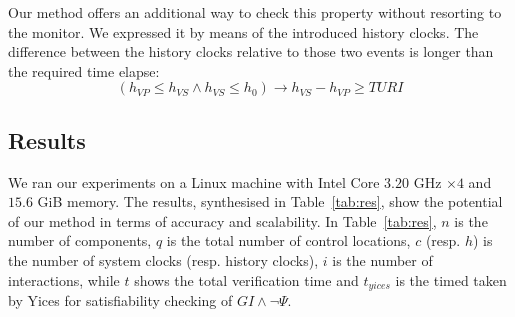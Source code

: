 \documentclass{LMCS}
\newcommand{\mycomment}[1]{}
\newcommand{\q}[1]{\textcolor{Fuchsia}{Q: #1}}
\theoremstyle{plain}\newtheorem{remark}[thm]{Remark}
\theoremstyle{plain}\newtheorem{example}[thm]{Example}
\begin{document}
Our method offers an additional way to check this property without
resorting to the monitor. We expressed it by means of the introduced
history clocks. The difference between the history clocks relative to
those two events is longer than the required time elapse:
\[(h_{VP} \leq h_{VS}  \wedge h_{VS} \leq h_0) \rightarrow  h_{VS} - h_{VP} \geq \textit{TURI}\]

\mycomment{ \q{ Should I put the following?}  Contrariwise, the method
  cannot verify that the time elapse between two consecutive
  \textit{VP venticular events} is bigger than $TURI$.  This is due to
  the fact that the history clocks record the last occurrence of each
  action. It results that in some way, the global invariant confounds
  consecutive occurrences of the same action. This is one of the cases
  where the method, being based on an over-approximation of the
  reachable states set, shows a false positive. A counter-example
  analysis module based on a guided backward analysis algorithm is
  under development and is meant to remedy this incompleteness.  }

\subsection{Results}
We ran our experiments on a Linux machine with Intel Core $3.20$ GHz
$\times 4$ and $15.6$ GiB memory. The results, synthesised in
Table~\ref{tab:res}, show the potential of our method in terms of
accuracy and scalability.  In Table~\ref{tab:res}, $n$ is the number
of components, $q$ is the total number of control locations, $c$
(resp. $h$) is the number of system clocks (resp. history clocks), $i$
is the number of interactions, while $t$ shows the total verification
time and $t_{yices}$ is the timed taken by Yices for satisfiability
checking of $GI \wedge \neg \Psi$. 
\end{document}
